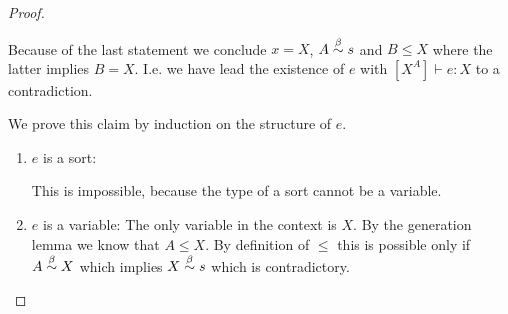 \begin{theorem}
\begin{proof}
\begin{enumerate}
                Because of the last statement we conclude $x = X$, $A \stackrel{\beta}{\sim} s$
                and $B \le X$ where the latter implies $B = X$. I.e. we have
                lead the existence of $e$ with $[X^A] \vdash e: X$ to a
                contradiction.

                We prove this claim by induction on the structure of $e$.
                \begin{enumerate}
                \item $e$ is a sort:

                    This is impossible, because the type of a sort cannot be a
                        variable.

                \item $e$ is a variable: The only variable in the context is
                    $X$. By the generation lemma we know that $A \le X$. By
                        definition of $\le$ this is possible only if $A \stackrel{\beta}{\sim}
                        X$ which implies $X \stackrel{\beta}{\sim} s$ which is contradictory.
                \end{enumerate}
        \end{enumerate}
    \end{proof}
\end{theorem}
